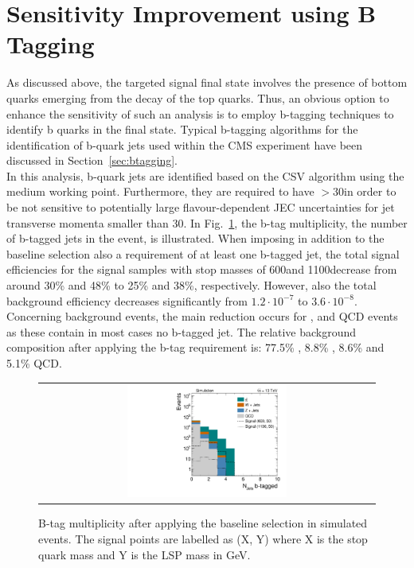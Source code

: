 \section{Sensitivity Improvement using B Tagging}
\label{sec:stop_btagging}
As discussed above, the targeted signal final state involves the presence of bottom quarks emerging from the decay of the top quarks. Thus, an obvious option to enhance the sensitivity of such an analysis is to employ b-tagging techniques to identify b quarks in the final state. Typical b-tagging algorithms for the identification of b-quark jets used within the CMS experiment have been discussed in Section~\ref{sec:btagging}. \\
In this analysis, b-quark jets are identified based on the CSV algorithm using the medium working point. Furthermore, they are required to have \pt$> 30$\gev in order to be not sensitive to potentially large flavour-dependent JEC uncertainties for jet transverse momenta smaller than 30\gev. In Fig.~\ref{fig:stop_baseline_btag}, the b-tag multiplicity, \ie the number of b-tagged jets in the event, is illustrated.  %
When imposing in addition to the baseline selection also a requirement of at least one b-tagged jet, the total signal efficiencies for the signal samples with stop masses of 600\gev and 1100\gev decrease from around 30\% and 48\% to 25\% and 38\%, respectively. However, also the total background efficiency decreases significantly from $1.2 \cdot 10^{-7}$ to $3.6 \cdot 10^{-8}$. Concerning background events, the main reduction occurs for \WJets, \ZJets and QCD events as these contain in most cases no b-tagged jet. The relative background composition after applying the b-tag requirement is: 77.5\% \ttbar, 8.8\% \WJets, 8.6\% \ZJets and 5.1\% QCD.        
\begin{figure}[!t]
  \centering
  \begin{tabular}{c}
                \includegraphics[width=0.49\textwidth]{figures/Stop_DeltaPhiSelection_N_jets_btagged.pdf}%
  \end{tabular}
  \caption{B-tag multiplicity after applying the baseline selection in simulated events. The signal points are labelled as (X, Y) where X is the stop quark mass and Y is the LSP mass in GeV.}
  \label{fig:stop_baseline_btag}
\end{figure}
